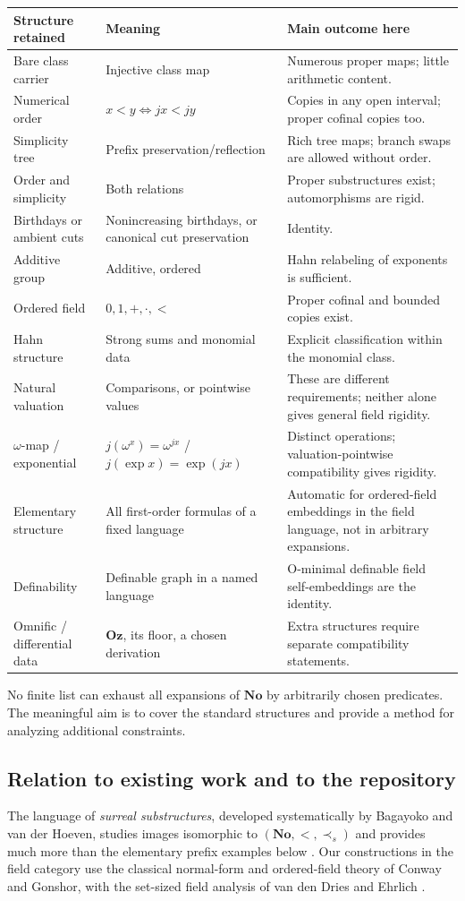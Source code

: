 \documentclass[11pt,a4paper]{article}
\numberwithin{equation}{section}
\theoremstyle{plain}
\theoremstyle{definition}
\theoremstyle{remark}
\newcommand{\No}{\mathbf{No}}
\newcommand{\Oz}{\mathbf{Oz}}
\newcommand{\spref}{\prec_s}
\begin{document}
\begin{longtable}{P{31mm}P{54mm}P{65mm}}
\toprule
Structure retained & Meaning & Main outcome here \\
\midrule
\endhead
Bare class carrier & Injective class map & Numerous proper maps; little arithmetic content. \\
Numerical order & $x<y\iff jx<jy$ & Copies in any open interval; proper cofinal copies too. \\
Simplicity tree & Prefix preservation/reflection & Rich tree maps; branch swaps are allowed without order. \\
Order and simplicity & Both relations & Proper substructures exist; automorphisms are rigid. \\
Birthdays or ambient cuts & Nonincreasing birthdays, or canonical cut preservation & Identity. \\
Additive group & Additive, ordered & Hahn relabeling of exponents is sufficient. \\
Ordered field & $0,1,+,\cdot,< $ & Proper cofinal and bounded copies exist. \\
Hahn structure & Strong sums and monomial data & Explicit classification within the monomial class. \\
Natural valuation & Comparisons, or pointwise values & These are different requirements; neither alone gives general field rigidity. \\
$\omega$-map / exponential & $j(\omega^x)=\omega^{jx}$ / $j(\exp x)=\exp(jx)$ & Distinct operations; valuation-pointwise compatibility gives rigidity. \\
Elementary structure & All first-order formulas of a fixed language & Automatic for ordered-field embeddings in the field language, not in arbitrary expansions. \\
Definability & Definable graph in a named language & O-minimal definable field self-embeddings are the identity. \\
Omnific / differential data & $\Oz$, its floor, a chosen derivation & Extra structures require separate compatibility statements. \\
\bottomrule
\end{longtable}

No finite list can exhaust all expansions of $\No$ by arbitrarily chosen
predicates. The meaningful aim is to cover the standard structures and
provide a method for analyzing additional constraints.

\subsection{Relation to existing work and to the repository}
The language of \emph{surreal substructures}, developed systematically by
Bagayoko and van der Hoeven, studies images isomorphic to
$(\No,<,\spref)$ and provides much more than the elementary prefix examples
below \cite{BVH}. Our constructions in the field category use the classical
normal-form and ordered-field theory of Conway and Gonshor, with the
set-sized field analysis of van den Dries and Ehrlich
\cite{Conway,Gonshor,vdDE}.
\end{document}
